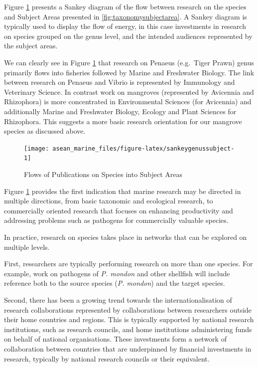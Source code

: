 \documentclass[]{book}
\theoremstyle{definition}
\theoremstyle{definition}
\theoremstyle{definition}
\theoremstyle{remark}
\begin{document}
Figure \ref{fig:sankeygenussubject} presents a Sankey diagram of the
flow between research on the species and Subject Areas presented in
\ref{fig:taxonomysubjectarea}. A Sankey diagram is typically used to
display the flow of energy, in this case investments in research on
species grouped on the genus level, and the intended audiences
represented by the subject areas.

We can clearly see in Figure \ref{fig:sankeygenussubject} that research
on Penaeus (e.g.~Tiger Prawn) genus primarily flows into fisheries
followed by Marine and Freshwater Biology. The link between research on
Penaeus and Vibrio is represented by Immunology and Veterinary Science.
In contrast work on mangroves (represented by Avicennia and Rhizophora)
is more concentrated in Environmental Sciences (for Avicennia) and
additionally Marine and Freshwater Biology, Ecology and Plant Sciences
for Rhizophora. This suggests a more basic research orientation for our
mangrove species as discussed above.

\begin{figure}

{\centering \texttt{[image: asean\_marine\_files/figure-latex/sankeygenussubject-1]} 

}

\caption{Flows of Publications on Species into Subject Areas}\label{fig:sankeygenussubject}
\end{figure}

Figure \ref{fig:sankeygenussubject} provides the first indication that
marine research may be directed in multiple directions, from basic
taxonomic and ecological research, to commercially oriented research
that focuses on enhancing productivity and addressing problems such as
pathogens for commercially valuable species.

In practice, research on species takes place in networks that can be
explored on multiple levels.

First, researchers are typically performing research on more than one
species. For example, work on pathogens of \emph{P. mondon} and other
shellfish will include reference both to the source species (\emph{P.
mondon}) and the target species.

Second, there has been a growing trend towards the internationalisation
of research collaborations represented by collaborations between
researchers outside their home countries and regions. This is typically
supported by national research institutions, such as research councils,
and home institutions administering funds on behalf of national
organisations. These investments form a network of collaboration between
countries that are underpinned by financial investments in research,
typically by national research councils or their equivalent.
\end{document}
